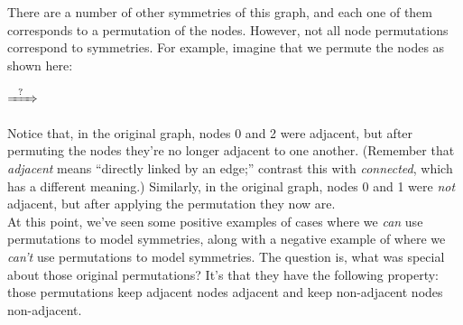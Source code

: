 \documentclass{article}
\renewcommand{\(}{\left(}
\renewcommand{\)}{\right)}
\theoremstyle{plain}
\theoremstyle{plain}
\theoremstyle{definition}
\begin{document}
There are a number of other symmetries of this graph, and each one of them corresponds to a permutation of the nodes. However, not all node permutations correspond to symmetries. For example, imagine that we permute the nodes as shown here:

\begin{center}
\begin{minipage}{0.45\textwidth}
\begin{flushright}
\end{flushright}
\end{minipage}
\hfill$\xRightarrow{\hphantom{-} ? \hphantom{-}}$\hfill
\begin{minipage}{0.45\textwidth}
\end{minipage}
\end{center}

Notice that, in the original graph, nodes 0 and 2 were adjacent, but after permuting the nodes they're no longer adjacent to one another. (Remember that \textit{adjacent} means ``directly linked by an edge;'' contrast this with \textit{connected}, which has a different meaning.) Similarly, in the original graph, nodes 0 and 1 were \textit{not} adjacent, but after applying the permutation they now are. \\

At this point, we've seen some positive examples of cases where we \textit{can} use permutations to model symmetries, along with a negative example of where we \textit{can't} use permutations to model symmetries. The question is, what was special about those original permutations? It's that they have the following property: those permutations keep adjacent nodes adjacent and keep non-adjacent nodes non-adjacent. \\
\end{document}
